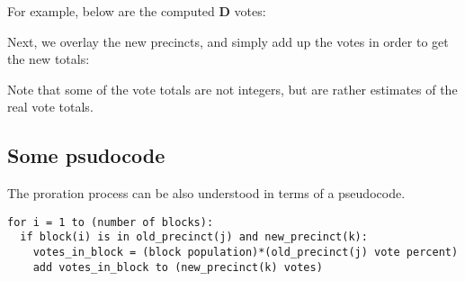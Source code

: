 For example, below are the computed {\color{NavyBlue} \bf D} votes:
\begin{center}
\end{center}
Next, we overlay the new precincts, and simply add up the votes 
in order to get the new totals:
\begin{center}
\end{center}
Note that some of the vote totals are not integers, but are rather 
estimates of the real vote totals.
\subsection{Some psudocode}
The proration process can be also understood in terms of 
a pseudocode.
\begin{verbatim}
for i = 1 to (number of blocks):
  if block(i) is in old_precinct(j) and new_precinct(k):
    votes_in_block = (block population)*(old_precinct(j) vote percent)
    add votes_in_block to (new_precinct(k) votes)
\end{verbatim}
